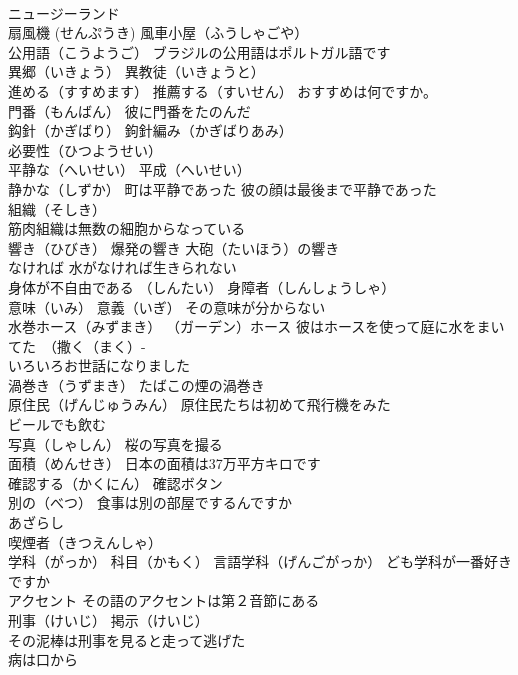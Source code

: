 \documentclass[8pt]{extreport}
\begin{document}
\begin{CJK}{UTF8}{min}
\\	ニュージーランド
\\	扇風機 (せんぷうき) 風車小屋（ふうしゃごや）
\\	公用語（こうようご） ブラジルの公用語はポルトガル語です
\\	異郷（いきょう） 異教徒（いきょうと）
\\	進める（すすめます） 推薦する（すいせん） おすすめは何ですか。
\\	門番（もんばん） 彼に門番をたのんだ
\\	鈎針（かぎばり） 鉤針編み（かぎばりあみ）
\\	必要性（ひつようせい）
\\	平静な（へいせい） 平成（へいせい） 
\\	静かな（しずか） 町は平静であった 彼の顔は最後まで平静であった
\\	組織（そしき）
\\	筋肉組織は無数の細胞からなっている
\\	響き（ひびき） 爆発の響き 大砲（たいほう）の響き
\\	なければ 水がなければ生きられない
\\	身体が不自由である （しんたい） 身障者（しんしょうしゃ）
\\	意味（いみ） 意義（いぎ） その意味が分からない
\\	水巻ホース（みずまき） （ガーデン）ホース 彼はホースを使って庭に水をまいてた　（撒く（まく）- 
\\	いろいろお世話になりました
\\	渦巻き（うずまき） たばこの煙の渦巻き
\\	原住民（げんじゅうみん） 原住民たちは初めて飛行機をみた
\\	ビールでも飲む
\\	写真（しゃしん） 桜の写真を撮る
\\	面積（めんせき） 日本の面積は37万平方キロです
\\	確認する（かくにん） 確認ボタン
\\	別の（べつ） 食事は別の部屋でするんですか
\\	あざらし
\\	喫煙者（きつえんしゃ）
\\	学科（がっか） 科目（かもく） 言語学科（げんごがっか） ども学科が一番好きですか
\\	アクセント その語のアクセントは第２音節にある
\\	刑事（けいじ） 掲示（けいじ）　
\\	その泥棒は刑事を見ると走って逃げた
\\	病は口から

\end{CJK}
\end{document}
